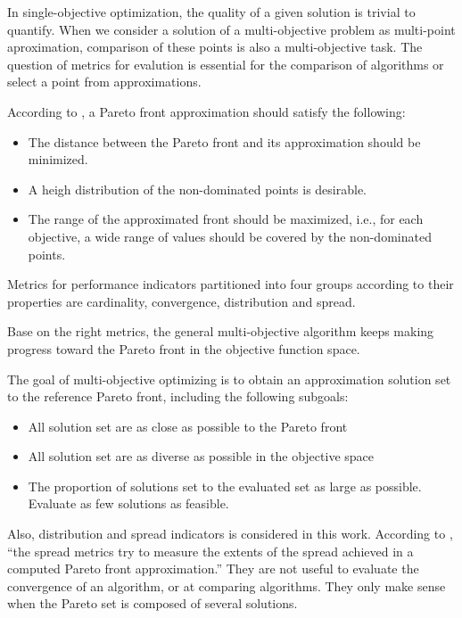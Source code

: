         In single-objective optimization, the quality of a given solution is trivial to quantify. When we consider a solution of a multi-objective problem as multi-point aproximation, comparison of these points is also a multi-objective task.
        The question of metrics for evalution is essential for the comparison of algorithms or select a point from approximations.

        According to \cite{ZitzlerDT00}, a Pareto front approximation should satisfy the following:
        \begin{itemize}
            \item The distance between the Pareto front and its approximation should be minimized.
            \item A heigh distribution of the non-dominated points is desirable.
            \item The range of the approximated front should be maximized, i.e., for each objective, a wide range of values should be covered by the non-dominated points.
        \end{itemize}

        Metrics for performance indicators partitioned into four groups according to their properties \cite{Audet2018PerformanceII} are cardinality, convergence, distribution and spread.

        Base on the right metrics, the general multi-objective algorithm keeps making progress toward the Pareto front in the objective function space.

        The goal of multi-objective optimizing is to obtain an approximation solution set to the reference Pareto front, including the following subgoals:
        \begin{itemize}
            \item All solution set are as close as possible to the Pareto front
            \item All solution set are as diverse as possible in the objective space
            \item The proportion of solutions set to the evaluated set as large as possible. Evaluate as few solutions as feasible.
        \end{itemize}

        Also, distribution and spread indicators is considered in this work. According to \cite{CustodioMVV11}, “the spread metrics try to measure the extents of the spread achieved in a computed Pareto front approximation.” They are not useful to evaluate the convergence of an algorithm, or at comparing algorithms. They only make sense when the Pareto set is composed of several solutions.

